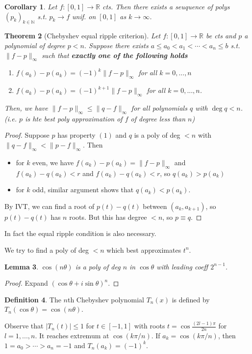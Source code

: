 \documentclass{article}
\theoremstyle{definition}
\newtheorem{defn}{Definition}[section]
\theoremstyle{remark}
\theoremstyle{plain}
\newtheorem{lem}[defn]{Lemma}
\newtheorem{thm}[defn]{Theorem}
\newtheorem{crly}[defn]{Corollary}
\newcommand{\NN}{\mathbb{N}}
\newcommand{\RR}{\mathbb{R}}
\begin{document}
\begin{crly}
    Let $f:[0,1]\to\RR$ cts. Then there exists a seuquence of polys $(p_k)_{k\in\NN}$ s.t. $p_k\to f$ unif. on $[0,1]$ as $k\to\infty$.
\end{crly}
\begin{thm}[Chebyshev equal ripple criterion]
    Let $f:[0,1]\to\RR$ be cts and $p$ a polynomial of degree $p<n$. Suppose there exists $a\le a_0<a_1<\cdots<a_n\le b$ s.t. $\|f-p\|_\infty$ such that \textbf{exactly one of the following holds}\begin{enumerate}[(1)]
        \item $f(a_k)-p(a_k)=(-1)^k\|f-p\|_\infty$ for all $k=0,...,n$
        \item $f(a_k)-p(a_k)=(-1)^{k+1}\|f-p\|_\infty$ for all $k=0,...,n$.
    \end{enumerate}
    Then, we have $\|f-p\|_\infty\le\|q-f\|_\infty$ for all polynomials $q$ with $\deg q<n$. (i.e. $p$ is hte best poly approximation of $f$ of degree less than $n$)
\end{thm}
\begin{proof}
    Suppose $p$ has property $(1)$ and $q$ is a poly of deg $<n$ with $\|q-f\|_\infty<\|p-f\|_\infty$. Then
    \begin{itemize}
        \item for $k$ even, we have $f(a_k)-p(a_k)=\|f-p\|_\infty$ and $f(a_k)-q(a_k)<r$ and $f(a_k)-q(a_k)<r$, so $q(a_k)>p(a_k)$
        \item for $k$ odd, similar argument shows that $q(a_k)<p(a_k)$.
    \end{itemize}
    By IVT, we can find a root of $p(t)-q(t)$ between $(a_k,a_{k+1})$, so $p(t)-q(t)$ has $n$ roots. But this has degree $<n$, so $p\equiv q$.    
\end{proof}
In fact the equal ripple condition is also necessary.

We try to find a poly of deg $<n$ which best approximates $t^n$.
\begin{lem}
    $\cos(n\theta)$ is a poly of deg $n$ in $\cos\theta$ with leading coeff $2^{n-1}$.
\end{lem}
\begin{proof}
    Expand $(\cos\theta+i\sin\theta)^n$.
\end{proof}
\begin{defn}
    The $n$th Chebyshev polynomial $T_n(x)$ is defined by $T_n(\cos\theta)=\cos(n\theta)$.
\end{defn}
Observe that $|T_n(t)|\le 1$ for $t\in[-1,1]$ with roots $t=\cos\frac{(2l-1)\pi}{2n}$ for $l=1,...,n$. It reaches extremum at $\cos(k\pi/n)$. If $a_k=\cos(k\pi/n)$, then $1=a_0>\cdots>a_n=-1$ and $T_n(a_k)=(-1)^k$.
\end{document}
